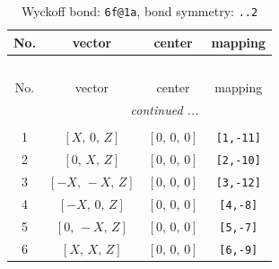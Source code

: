 \documentclass[fleqn,8pt]{jsarticle}
\begin{document}
\begin{longtable}{cccc}
\caption{Wyckoff bond: {\tt 6f@1a}, bond symmetry: {\tt ..2}}
 \\
 \hline \hline
No. & vector & center & mapping \\ \hline \endfirsthead

\multicolumn{3}{l}{\tablename\ \thetable{}} \\
 \hline \hline
No. & vector & center & mapping \\ \hline \endhead

 \hline \hline
\multicolumn{3}{r}{\footnotesize\it continued ...} \\ \endfoot

 \hline \hline
\multicolumn{3}{r}{} \\ \endlastfoot

1 & $\left[ X,\, 0,\, Z \right]$ & $\left[ 0,\, 0,\, 0 \right]$ & {\tt [1,-11]} \\ \hline
2 & $\left[ 0,\, X,\, Z \right]$ & $\left[ 0,\, 0,\, 0 \right]$ & {\tt [2,-10]} \\ \hline
3 & $\left[ - X,\, - X,\, Z \right]$ & $\left[ 0,\, 0,\, 0 \right]$ & {\tt [3,-12]} \\ \hline
4 & $\left[ - X,\, 0,\, Z \right]$ & $\left[ 0,\, 0,\, 0 \right]$ & {\tt [4,-8]} \\ \hline
5 & $\left[ 0,\, - X,\, Z \right]$ & $\left[ 0,\, 0,\, 0 \right]$ & {\tt [5,-7]} \\ \hline
6 & $\left[ X,\, X,\, Z \right]$ & $\left[ 0,\, 0,\, 0 \right]$ & {\tt [6,-9]} \\
\end{longtable}
\renewcommand{\arraystretch}{1.2}
\end{document}
